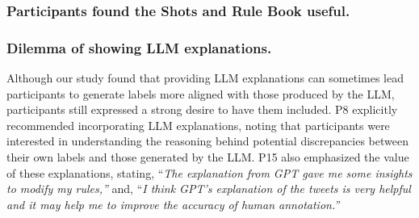 \subsubsection{Participants found the Shots and Rule Book useful.}




\subsubsection{Dilemma of showing LLM explanations.}
Although our study found that providing LLM explanations can sometimes lead participants to generate labels more aligned with those produced by the LLM, participants still expressed a strong desire to have them included. P8 explicitly recommended incorporating LLM explanations, noting that participants were interested in understanding the reasoning behind potential discrepancies between their own labels and those generated by the LLM. P15 also emphasized the value of these explanations, stating, ``\textit{The explanation from GPT gave me some insights to modify my rules,''} and, ``\textit{I think GPT's explanation of the tweets is very helpful and it may help me to improve the accuracy of human annotation.''}

\begin{comment}
 

\subsubsection{What can be improved in \system?}
Some participants faced challenges when learning the system, and it can take them a long time to get comfortable with it. P1 said, ``\textit{The system is not logically clear for me because the system needs to jump in between different tabs, which is different than a normal workflow.}'' 
Some participants became confused with the system, even after several iterations. For instance, a few participants forgot that to proceed to the next iteration, they needed to sample the data and click ‘Start Annotation.’ Research team members need to remind participants of the workflow continuously. Additionally, the nature of the task requires moving from one tab to another, which adds difficulty for participants to navigate the interface and causes confusion.

   
\end{comment}

